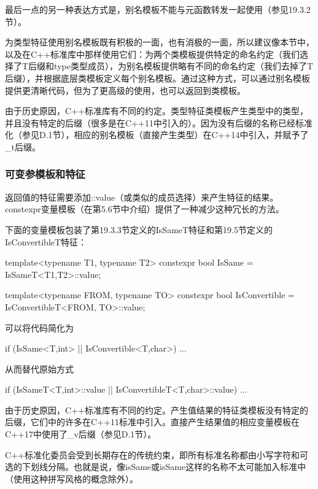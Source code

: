 最后一点的另一种表达方式是，别名模板不能与元函数转发一起使用（参见19.3.2节）。

为类型特征使用别名模板既有积极的一面，也有消极的一面，所以建议像本节中，以及在C++标准库中那样使用它们：为两个类模板提供特定的命名约定（我们选择了T后缀和type类型成员），为别名模板提供略有不同的命名约定（我们去掉了T后缀），并根据底层类模板定义每个别名模板。通过这种方式，可以通过别名模板提供更清晰代码，但为了更高级的使用，也可以返回到类模板。

由于历史原因，C++标准库有不同的约定。类型特征类模板产生类型中的类型，并且没有特定的后缀（很多是在C++11中引入的）。因为没有后缀的名称已经标准化（参见D.1节），相应的别名模板（直接产生类型）在C++14中引入，并赋予了\_t后缀。

\subsubsection{可变参模板和特征}

返回值的特征需要添加::value（或类似的成员选择）来产生特征的结果。constexpr变量模板（在第5.6节中介绍）提供了一种减少这种冗长的方法。

下面的变量模板包装了第19.3.3节定义的IsSameT特征和第19.5节定义的IsConvertibleT特征：

\begin{cpp}
template<typename T1, typename T2>
	constexpr bool IsSame = IsSameT<T1,T2>::value;
	
template<typename FROM, typename TO>
	constexpr bool IsConvertible = IsConvertibleT<FROM, TO>::value;
\end{cpp}

可以将代码简化为

\begin{cpp}
if (IsSame<T,int> || IsConvertible<T,char>) ...
\end{cpp}

从而替代原始方式

\begin{cpp}
if (IsSameT<T,int>::value || IsConvertibleT<T,char>::value) ...
\end{cpp}

由于历史原因，C++标准库有不同的约定。产生值结果的特征类模板没有特定的后缀，它们中的许多在C++11标准中引入。直接产生结果值的相应变量模板在C++17中使用了\_v后缀（参见D.1节）。

\begin{notice}
C++标准化委员会受到长期存在的传统约束，即所有标准名称都由小写字符和可选的下划线分隔。也就是说，像isSame或isSame这样的名称不太可能加入标准中（使用这种拼写风格的概念除外）。
\end{notice}




